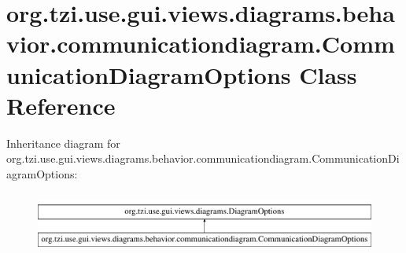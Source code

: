 \hypertarget{classorg_1_1tzi_1_1use_1_1gui_1_1views_1_1diagrams_1_1behavior_1_1communicationdiagram_1_1_communication_diagram_options}{\section{org.\-tzi.\-use.\-gui.\-views.\-diagrams.\-behavior.\-communicationdiagram.\-Communication\-Diagram\-Options Class Reference}
\label{classorg_1_1tzi_1_1use_1_1gui_1_1views_1_1diagrams_1_1behavior_1_1communicationdiagram_1_1_communication_diagram_options}
}
Inheritance diagram for org.\-tzi.\-use.\-gui.\-views.\-diagrams.\-behavior.\-communicationdiagram.\-Communication\-Diagram\-Options\-:\begin{figure}[H]
\begin{center}
\leavevmode
\includegraphics[height=2.000000cm]{classorg_1_1tzi_1_1use_1_1gui_1_1views_1_1diagrams_1_1behavior_1_1communicationdiagram_1_1_communication_diagram_options}
\end{center}
\end{figure}
